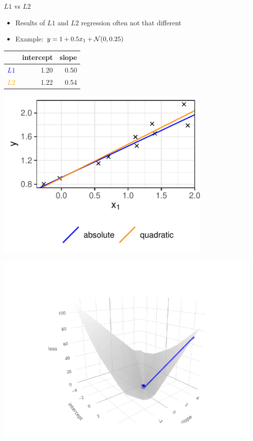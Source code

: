 \documentclass[11pt,compress,t,notes=noshow, xcolor=table]{beamer}
\begin{document}
\begin{vbframe}{$L1$ vs $L2$}

\begin{itemize}
    \item Results of $L1$ and $L2$ regression often not that different
    \item Example: $y = 1 + 0.5 x_1 + \mathcal{N}(0, 0.25)$
\end{itemize}
    
\vfill

\begin{minipage}[b]{0.65\textwidth}
    \hspace{0.7cm}
    \footnotesize
    \begin{tabular}{r|r|r}
        & intercept & slope \\ \hline
        \textcolor{blue}{$L1$} & 1.20 & 0.50 \\ \hline
        \textcolor{orange}{$L2$} & 1.22 & 0.54 
    \end{tabular}

    \vspace{0.5cm}
    \includegraphics[width=0.8\textwidth]{figure/reg_l1_comparison.pdf}
\end{minipage}
\begin{minipage}[b]{0.34\textwidth}
    \includegraphics[width=\textwidth, trim=80 0 100 80, clip]{
    figure/reg_l1_comparison_optim_abs.pdf}
    

\end{minipage}
\end{vbframe}
\end{document}
